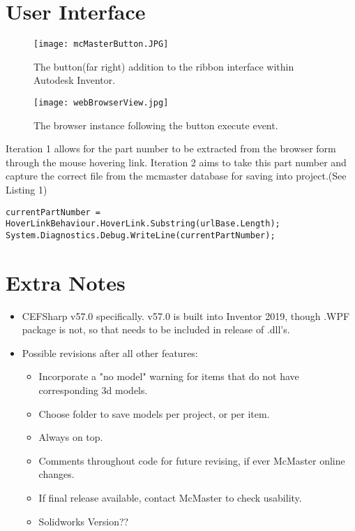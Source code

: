\documentclass[12pt, letterpaper]{article}
\begin{document}
\section{User Interface}
\begin{figure}[H]
    \centering
    \texttt{[image: mcMasterButton.JPG]}
    \caption{The button(far right) addition to the ribbon interface within Autodesk Inventor.}
\end{figure}
\begin{figure}[H]
    \centering
    \texttt{[image: webBrowserView.jpg]}
    \caption{The browser instance following the button execute event.}
\end{figure}

Iteration 1 allows for the part number to be extracted from the browser form through the mouse hovering link. Iteration 2 aims to take this part number and capture the correct file from the mcmaster database for saving into project.(See Listing 1)\\
\begin{lstlisting}
currentPartNumber = HoverLinkBehaviour.HoverLink.Substring(urlBase.Length);
System.Diagnostics.Debug.WriteLine(currentPartNumber);
\end{lstlisting}

\newpage
\section{Extra Notes}
\begin{itemize}
    \item CEFSharp v57.0 specifically. v57.0 is built into Inventor 2019, though .WPF package is not, so that needs to be included in release of .dll's.
    \item Possible revisions after all other features:
    \begin{itemize}
        \item Incorporate a "no model" warning for items that do not have corresponding 3d models.
        \item Choose folder to save models per project, or per item.
        \item Always on top.
        \item Comments throughout code for future revising, if ever McMaster online changes.
        \item If final release available, contact McMaster to check usability. 
        \item Solidworks Version??
    \end{itemize}
\end{itemize}
\end{document}
